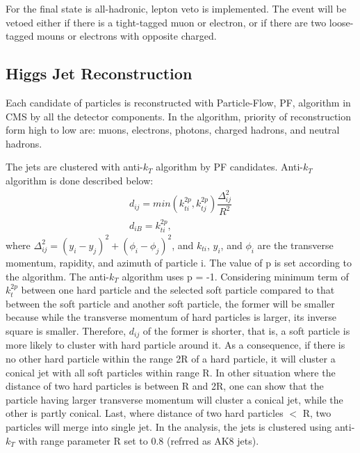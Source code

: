 For the final state is all-hadronic, lepton veto is implemented. The event will be vetoed either if there is a tight-tagged muon or electron, or if there are two loose-tagged mouns or electrons with opposite charged.

\subsection{Higgs Jet Reconstruction} 
Each candidate of particles is reconstructed with Particle-Flow, PF, algorithm in CMS by all the detector components. In the algorithm, priority of reconstruction form high to low are: muons, electrons, photons, charged hadrons, and neutral hadrons.

The jets are clustered with anti-$k_{T}$ algorithm by PF candidates. Anti-$k_{T}$ algorithm is done described below: 
\begin{equation} \label{eq1}
\begin{split}
d_{ij} = min(k^{2p}_{ti},k^{2p}_{tj})\dfrac{\Delta ^2_{ij}}{R^2}\\
d_{iB} = k^{2p}_{ti}, 	
\end{split}
\end{equation}
where $\Delta ^{2}_{ij}= (y_{i}-y_{j})^2+(\phi_{i}-\phi_{j})^2$, and $k_{ti}$, $y_{i}$, and $\phi _{i}$ are the transverse momentum, rapidity, and azimuth of particle i. The value of p is set according to the algorithm. The anti-$k_{T}$ algorithm uses p = -1. 
Considering minimum term of $k^{2p}_{t}$ between one hard particle and the selected soft particle compared to that between the soft particle and another soft particle, the former will be smaller because while the transverse momentum of hard particles is larger, its inverse square is smaller. 
Therefore, $d_{ij}$ of the former is shorter, that is, a soft particle is more likely to cluster with hard particle around it. 
As a consequence, if there is no other hard particle within the range 2R of a hard particle, it will cluster a conical jet with all soft particles within range R. 
In other situation where the distance of two hard particles is between R and 2R, one can show that the particle having larger transverse momentum will cluster a  conical jet, while the other is partly conical.
Last, where distance of two hard particles $<$ R, two particles will merge into single jet. In the analysis, the jets is clustered using anti-$k_{T}$ with range parameter R set to 0.8 (refrred as AK8 jets).

